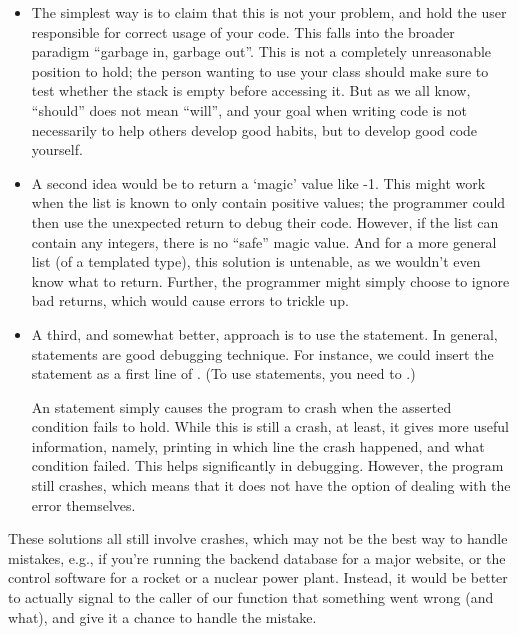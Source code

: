 \begin{itemize}
\item The simplest way is to claim that this is not your problem, and hold
the user responsible for correct usage of your code.
This falls into the broader paradigm ``garbage in, garbage out''. 
This is not a completely unreasonable position to hold; 
the person wanting to use your class should make sure to test whether
the stack is empty before accessing it.
But as we all know, ``should'' does not mean ``will'', and your goal
when writing code is not necessarily to help others develop good
habits, but to develop good code yourself.

\item A second idea would be to return a `magic' value like -1.
This might work when the list is known to only contain positive
values; the programmer could then use the unexpected return to debug
their code. 
However, if the list can contain any integers, there is no ``safe''
magic value. And for a more general list (of a templated type), this
solution is untenable, as we wouldn't even know what to return. 
Further, the programmer might simply choose to ignore bad
returns, which would cause errors to trickle up.

\item A third, and somewhat better, approach is to use the 
statement.
In general,  statements are good debugging technique.
For instance, we could insert the statement
 as a first line of
. 
(To use  statements, you need to .)

An  statement simply causes the program to crash when the
asserted condition fails to hold. While this is still a crash, at
least, it gives more useful information, namely, printing in which
line the crash happened, and what condition failed. This helps
significantly in debugging.
However, the program still crashes, which means that it does not have
the option of dealing with the error themselves.
\end{itemize}

These solutions all still involve crashes, which may not be the best
way to handle mistakes, e.g., if you're running the backend database
for a major website, or the control software for a rocket or a nuclear
power plant.
Instead, it would be better to actually signal to the caller of our
function that something went wrong (and what), and give it a chance to
handle the mistake.

